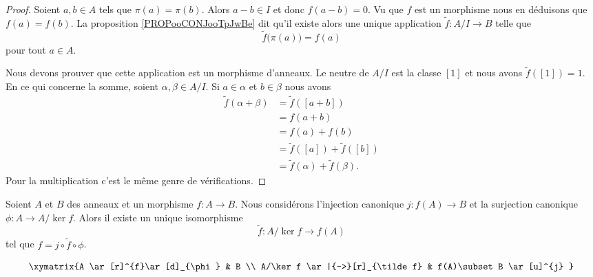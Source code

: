 \begin{proof}
	Soient \( a,b\in A\) tels que \( \pi(a)=\pi(b)\). Alors \( a-b\in I\) et donc \( f(a-b)=0\). Vu que \( f\) est un morphisme nous en déduisons que \( f(a)=f(b)\). La proposition \ref{PROPooCONJooTpJwBe} dit qu'il existe alors une unique application \(\tilde f \colon A/I\to B  \) telle que
	\begin{equation}
		\tilde f\big( \pi(a) \big)=f(a)
	\end{equation}
	pour tout \( a\in A\).

	Nous devons prouver que cette application est un morphisme d'anneaux. Le neutre de \( A/I\) est la classe \( [1]\) et nous avons \( \tilde f([1])=1\). En ce qui concerne la somme, soient \( \alpha,\beta\in A/I\). Si \( a\in \alpha\) et \( b\in \beta\) nous avons
	\begin{subequations}
		\begin{align}
			\tilde f(\alpha+\beta) & =\tilde f([a+b])                   \\
			                       & =f(a+b)                            \\
			                       & =f(a)+f(b)                         \\
			                       & =\tilde f([a])+\tilde f([b])       \\
			                       & =\tilde f(\alpha)+\tilde f(\beta).
		\end{align}
	\end{subequations}
	Pour la multiplication c'est le même genre de vérifications.
\end{proof}

\begin{proposition}   \label{PROPooJALPooHFIObB}
	Soient \( A\) et \( B\) des anneaux et un morphisme \( f\colon A\to B\). Nous considérons l'injection canonique \( j\colon f(A)\to B\) et la surjection canonique \( \phi\colon A\to A/\ker f\). Alors il existe un unique isomorphisme
	\begin{equation}
		\tilde f \colon A/\ker f\to f(A)
	\end{equation}
	tel que \( f=j\circ\tilde f\circ\phi\).

	\begin{equation}
		\xymatrix{%
		A \ar[r]^{f}\ar[d]_{\phi}       &   B                         \\
		A/\ker f    \ar|{-->}[r]_{\tilde f}   &   f(A)\subset B \ar[u]^{j}
		}
	\end{equation}
\end{proposition}

